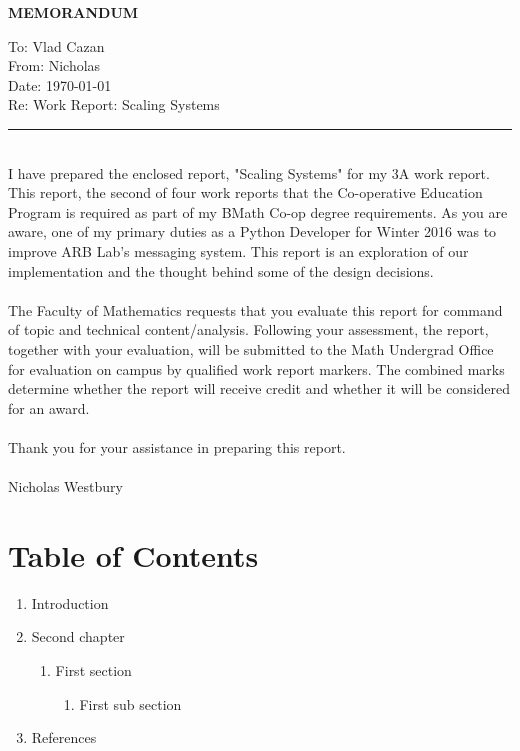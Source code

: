 \documentclass[12pt]{report}
\newcommand{\HRule}[1]{\rule{\linewidth}{#1}}
\begin{document}
\newpage\noindent\thispagestyle{empty}
\LARGE\textbf{\uppercase{MEMORANDUM}} \normalsize
\vspace*{-10px}
\begin{singlespacing}\noindent
\vspace*{-10px}
To: Vlad Cazan\\
\vspace*{-10px}
From: Nicholas\\
\vspace*{-10px}
Date: \today\\
\vspace*{-10px}
Re: Work Report: Scaling Systems\\
\end{singlespacing}
\HRule{1.5pt}\\
I have prepared the enclosed report, "Scaling Systems" for my 3A work report. This report, the second of four work reports that the Co-operative Education Program is required as part of my BMath Co-op degree requirements. As you are aware, one of my primary duties as a Python Developer for Winter 2016 was to improve ARB Lab's messaging system. This report is an exploration of our implementation and the thought behind some of the design decisions.\\ \\ \noindent
The Faculty of Mathematics requests that you evaluate this report for command of topic and technical content/analysis. Following your assessment, the report, together with your evaluation, will be submitted to the Math Undergrad Office for evaluation on campus by qualified work report markers. The combined
marks determine whether the report will receive credit and whether it will be considered for an award. \\ \\
Thank you for your assistance in preparing this report.\\ \\
Nicholas Westbury

\newpage\thispagestyle{fancy}\sectionfont{\scshape}
\section*{Table of Contents}
\normalsize
\begin{enumerate}[label=\arabic*,leftmargin=*,labelsep=2ex,ref=\arabic*]
    \item Introduction 
    \item Second chapter 
      \begin{enumerate}[label*=.\arabic*,leftmargin=*,labelsep=2ex]
        \item First section 
        \begin{enumerate}[label*=.\arabic*,leftmargin=*,labelsep=2ex]
        \item First sub section 
      \end{enumerate}
      \end{enumerate}
    \item References 
\end{enumerate}
\end{document}

